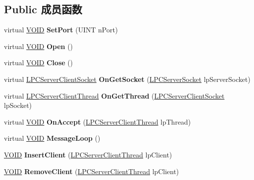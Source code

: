 \subsection*{Public 成员函数}
\begin{DoxyCompactItemize}
\item 
\mbox{\label{class_c_server_socket_ade2784c6aa010c2521b2dd6b53f15b8e}} 
virtual \hyperlink{interfacevoid}{V\+O\+ID} {\bfseries Set\+Port} (U\+I\+NT n\+Port)
\item 
\mbox{\label{class_c_server_socket_a4bfc423b6367d20a7fdc706f8a8a4a8e}} 
virtual \hyperlink{interfacevoid}{V\+O\+ID} {\bfseries Open} ()
\item 
\mbox{\label{class_c_server_socket_a7d39b9613f8bd0cb5f4f31f8bed6f070}} 
virtual \hyperlink{interfacevoid}{V\+O\+ID} {\bfseries Close} ()
\item 
\mbox{\label{class_c_server_socket_a26d7b438cf452a27ca50435d649a35c9}} 
virtual \hyperlink{class_c_server_client_socket}{L\+P\+C\+Server\+Client\+Socket} {\bfseries On\+Get\+Socket} (\hyperlink{class_c_server_socket}{L\+P\+C\+Server\+Socket} lp\+Server\+Socket)
\item 
\mbox{\label{class_c_server_socket_a737bd2803bd49496f8b74d8c414bc3fc}} 
virtual \hyperlink{class_c_server_client_thread}{L\+P\+C\+Server\+Client\+Thread} {\bfseries On\+Get\+Thread} (\hyperlink{class_c_server_client_socket}{L\+P\+C\+Server\+Client\+Socket} lp\+Socket)
\item 
\mbox{\label{class_c_server_socket_a3c89c4b6c79dd8f9f9d99165b5505d67}} 
virtual \hyperlink{interfacevoid}{V\+O\+ID} {\bfseries On\+Accept} (\hyperlink{class_c_server_client_thread}{L\+P\+C\+Server\+Client\+Thread} lp\+Thread)
\item 
\mbox{\label{class_c_server_socket_a630d56730f3410970be632ec66157620}} 
virtual \hyperlink{interfacevoid}{V\+O\+ID} {\bfseries Message\+Loop} ()
\item 
\mbox{\label{class_c_server_socket_afe71a5d24ee1864a6fb0dc0a2577b241}} 
\hyperlink{interfacevoid}{V\+O\+ID} {\bfseries Insert\+Client} (\hyperlink{class_c_server_client_thread}{L\+P\+C\+Server\+Client\+Thread} lp\+Client)
\item 
\mbox{\label{class_c_server_socket_aee7b807f82f81f962a87c52ad5c481c2}} 
\hyperlink{interfacevoid}{V\+O\+ID} {\bfseries Remove\+Client} (\hyperlink{class_c_server_client_thread}{L\+P\+C\+Server\+Client\+Thread} lp\+Client)
\end{DoxyCompactItemize}
